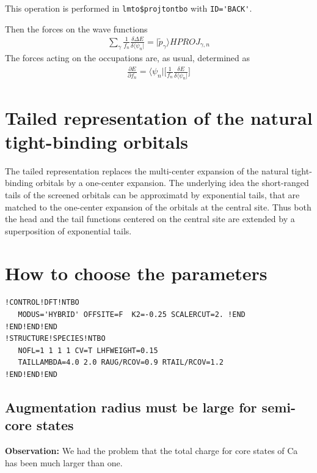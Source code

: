 \documentclass[11pt,a4paper]{report}
\begin{document}
This operation is performed in
\verb|lmto$projtontbo| with \verb|ID='BACK'|.


Then the forces on the wave functions 
\begin{eqnarray}
\sum_{\gamma}
\frac{1}{f_n}\frac{\delta \Delta E}{\delta\langle\psi_n|}
=|\tilde{p}_\gamma\rangle HPROJ_{\gamma,n}
\end{eqnarray}
The forces acting on the occupations are, as usual, determined as
\begin{eqnarray}
\frac{\partial E}{\partial f_n}=\langle\psi_n|
\biggl[
\frac{1}{f_n}\frac{\delta E}{\delta\langle\psi_n|}
\biggr]
\end{eqnarray}

\section{Tailed representation of the natural tight-binding orbitals}
The tailed representation replaces the multi-center expansion of the
natural tight-binding orbitals by a one-center expansion. The
underlying idea the short-ranged tails of the screened orbitals can be
approximatd by exponential tails, that are matched to the one-center
expansion of the orbitals at the central site. Thus both the head and
the tail functions centered on the central site are extended by a
superposition of exponential tails.

\section{How to choose the parameters}
\begin{verbatim}
!CONTROL!DFT!NTBO 
   MODUS='HYBRID' OFFSITE=F  K2=-0.25 SCALERCUT=2. !END
!END!END!END
!STRUCTURE!SPECIES!NTBO    
   NOFL=1 1 1 1 CV=T LHFWEIGHT=0.15
   TAILLAMBDA=4.0 2.0 RAUG/RCOV=0.9 RTAIL/RCOV=1.2
!END!END!END
\end{verbatim}

\subsection{Augmentation radius must be large for semi-core states}
\textbf{Observation:} We had the problem that the total charge for
core states of Ca has been much larger than one.
\end{document}
